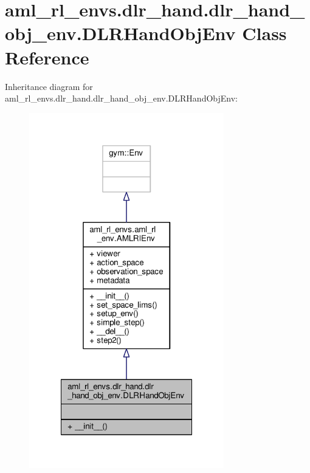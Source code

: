 \hypertarget{classaml__rl__envs_1_1dlr__hand_1_1dlr__hand__obj__env_1_1_d_l_r_hand_obj_env}{\section{aml\-\_\-rl\-\_\-envs.\-dlr\-\_\-hand.\-dlr\-\_\-hand\-\_\-obj\-\_\-env.\-D\-L\-R\-Hand\-Obj\-Env Class Reference}
\label{classaml__rl__envs_1_1dlr__hand_1_1dlr__hand__obj__env_1_1_d_l_r_hand_obj_env}
}


Inheritance diagram for aml\-\_\-rl\-\_\-envs.\-dlr\-\_\-hand.\-dlr\-\_\-hand\-\_\-obj\-\_\-env.\-D\-L\-R\-Hand\-Obj\-Env\-:
\nopagebreak
\begin{figure}[H]
\begin{center}
\leavevmode
\includegraphics[width=240pt]{classaml__rl__envs_1_1dlr__hand_1_1dlr__hand__obj__env_1_1_d_l_r_hand_obj_env__inherit__graph}
\end{center}
\end{figure}


